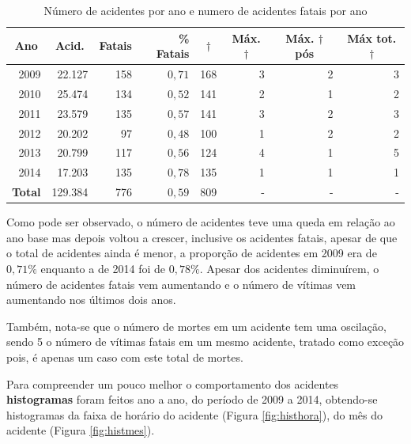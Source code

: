 \documentclass[11pt,article,oneside,a4paper]{abntex2}
\begin{document}
\begin{table}[h]
	\begin{center}
		\begin{small}
		\caption{Número de acidentes por ano e numero de acidentes fatais por ano} \label{tab:dataset}
		\begin{tabular}{r|r|r|r|r|r|r|r}
		\hline
\multicolumn{1}{c|}{\textbf{Ano}} & \multicolumn{1}{c|}{\textbf{Acid.}} & \textbf{Fatais} & \textbf{\% Fatais} & \multicolumn{1}{c|}{\textbf{$\dagger$}} & \multicolumn{1}{c|}{\textbf{Máx. $\dagger$}} & \multicolumn{1}{c|}{\textbf{Máx. $\dagger$ pós}} & \multicolumn{1}{c}{\textbf{Máx tot. $\dagger$}} \\ \hline
2009 & 22.127 & 158 & $0,71$ & 168 & 3 & 2 & 3 \\
2010 & 25.474 & 134 & $0,52$ & 141 & 2 & 1 & 2 \\
2011 & 23.579 & 135 & $0,57$ & 141 & 3 & 2 & 3 \\
2012 & 20.202 & 97  & $0,48$ & 100 & 1 & 2 & 2 \\
2013 & 20.799 & 117 & $0,56$ & 124 & 4 & 1 & 5 \\
2014 & 17.203 & 135 & $0,78$ & 135 & 1 & 1 & 1 \\ \hline
\multicolumn{1}{l|}{\textbf{Total}} & 129.384 & 776 & $0,59$ & 809 & - & - & - \\ \hline
		\end{tabular}
		\end{small}
	\end{center}
\end{table}

Como pode ser observado, o número de acidentes teve uma queda em relação ao ano base mas depois voltou a crescer, inclusive os acidentes fatais, apesar de que o total de acidentes ainda é menor, a proporção de acidentes em 2009 era de $0,71\%$ enquanto a de 2014 foi de $0,78\%$. Apesar dos acidentes diminuírem, o número de acidentes fatais vem aumentando e o número de vítimas vem aumentando nos últimos dois anos. 

Também, nota-se que o número de mortes em um acidente tem uma oscilação, sendo 5 o número de vítimas fatais em um mesmo acidente, tratado como exceção pois, é apenas um caso com este total de mortes.

Para compreender um pouco melhor o comportamento dos acidentes \textbf{histogramas} foram feitos ano a ano, do período de 2009 a 2014, obtendo-se histogramas da faixa de horário do acidente (Figura \ref{fig:histhora}), do mês do acidente (Figura \ref{fig:histmes}).
\end{document}

